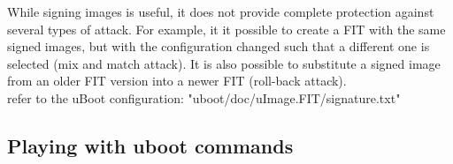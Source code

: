 \documentclass{article}
\begin{document}
\begin{mybox}[title={Signed Configurations to avoid mix and match attack}]
While signing images is useful, it does not provide complete protection against several types of attack. For example, it it possible to create a FIT with the same signed images, but with the configuration changed such that a different one is selected (mix and match attack). It is also possible to substitute a signed image from an older FIT version into a newer FIT (roll-back attack).\\

refer to the uBoot configuration: "uboot/doc/uImage.FIT/signature.txt"
\end{mybox}


\subsection{Playing with uboot commands}
\end{document}
